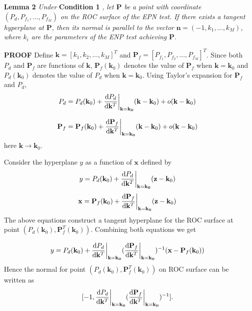 \noindent \textbf{Lemma 2}
\textit{
\noindent Under}
\textbf{Condition 1}
\textit{, let $\mathbf{P}$ be a point with coordinate $(P_d, P_{f_1}, ..., P_{f_M})$ on the ROC surface of the EPN test. If there exists a tangent hyperplane at $\mathbf{P}$, then its normal is parallel to the vector $\mathbf{n} = (-1, k_1, ..., k_M)$, where $k_i$ are the parameters of the ENP test achieving $\mathbf{P}$.
}

\noindent\textbf{PROOF}
Define $\mathbf{k} = [k_1, k_2, ..., k_M]^T$ and $\mathbf{P}_f = [P_{f_1}, P_{f_2}, ..., P_{f_M}]^T$. Since both $P_d$ and $\mathbf{P}_f$ are functions of $\mathbf{k}$, $\mathbf{P}_f(\mathbf{k}_0)$ denotes the value of $\mathbf{P}_f$ when $\mathbf{k} = \mathbf{k}_0$ and $P_d(\mathbf{k}_0)$ denotes the value of $P_d$ when $\mathbf{k} = \mathbf{k}_0$. Using Taylor's expansion \cite{zill2011advanced} for $\mathbf{P}_f$ and $P_d$,
\begin{equation}
\label{pro: pd}
P_d = P_d(\mathbf{k}_0) + \frac{\mathrm{d}P_d}{\mathrm{d}\mathbf{k}^T}\bigg{|}_{\mathbf{k}=\mathbf{k_0}}(\mathbf{k} - \mathbf{k}_0)
+ o(\mathbf{k} - \mathbf{k}_0)
\end{equation}

\begin{equation}
\label{pro: pf}
\mathbf{P}_f = \mathbf{P}_f(\mathbf{k}_0) + \frac{\mathrm{d}\mathbf{P}_f}{\mathrm{d}\mathbf{k}^T}\bigg{|}_{\mathbf{k}=\mathbf{k_0}}(\mathbf{k} - \mathbf{k}_0)
+ o(\mathbf{k} - \mathbf{k}_0)
\end{equation}
here $\mathbf{k} \rightarrow \mathbf{k}_0$.

Consider the hyperplane $y$ as a function of $\mathbf{x}$ defined by
\begin{equation}
\label{pro: y}
y = P_d(\mathbf{k}_0) + \frac{\mathrm{d}P_d}{\mathrm{d}\mathbf{k}^T}\bigg{|}_{\mathbf{k}=\mathbf{k_0}}(\mathbf{z} - \mathbf{k}_0)
\end{equation}
\begin{equation}
\label{pro: x}
\mathbf{x} = \mathbf{P}_f(\mathbf{k}_0) + \frac{\mathrm{d}\mathbf{P}_f}{\mathrm{d}\mathbf{k}^T}\bigg{|}_{\mathbf{k}=\mathbf{k_0}}(\mathbf{z} - \mathbf{k}_0)
\end{equation}
The above equations construct a tangent hyperplane for the ROC surface at point $(P_d(\mathbf{k}_0), \mathbf{P}_f^T(\mathbf{k}_0))$. Combining both equations  we get

\begin{equation}
\label{pro : y2}
y = P_d(\mathbf{k}_0) + \frac{\mathrm{d}P_d}{\mathrm{d}\mathbf{k}^T}\bigg{|}_{\mathbf{k}=\mathbf{k_0}}(
\frac{\mathrm{d}\mathbf{P}_f}{\mathrm{d}\mathbf{k}^T}\bigg{|}_{\mathbf{k}=\mathbf{k_0}}
)^{-1} (\mathbf{x} - \mathbf{P}_f(\mathbf{k}_0))
\end{equation}
Hence the normal for point $(P_d(\mathbf{k}_0), \mathbf{P}_f^T(\mathbf{k}_0))$ on ROC surface can be written as
\begin{equation}
\label{vec: normal}
[-1, \frac{\mathrm{d}P_d}{\mathrm{d}\mathbf{k}^T}\bigg{|}_{\mathbf{k}=\mathbf{k_0}}(
\frac{\mathrm{d}\mathbf{P}_f}{\mathrm{d}\mathbf{k}^T}\bigg{|}_{\mathbf{k}=\mathbf{k_0}}
)^{-1}
].
\end{equation}

